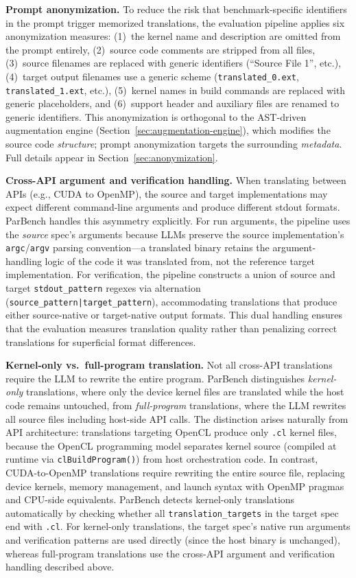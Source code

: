 \documentclass[conference]{IEEEtran}
\begin{document}
\textbf{Prompt anonymization.} To reduce the risk that benchmark-specific identifiers in the prompt trigger memorized translations, the evaluation pipeline applies six anonymization measures: (1)~the kernel name and description are omitted from the prompt entirely, (2)~source code comments are stripped from all files, (3)~source filenames are replaced with generic identifiers (``Source File 1'', etc.), (4)~target output filenames use a generic scheme (\texttt{translated\_0.ext}, \texttt{translated\_1.ext}, etc.), (5)~kernel names in build commands are replaced with generic placeholders, and (6)~support header and auxiliary files are renamed to generic identifiers. This anonymization is orthogonal to the AST-driven augmentation engine (Section~\ref{sec:augmentation-engine}), which modifies the source code \emph{structure}; prompt anonymization targets the surrounding \emph{metadata}. Full details appear in Section~\ref{sec:anonymization}.

\textbf{Cross-API argument and verification handling.} When translating between APIs (e.g., CUDA to OpenMP), the source and target implementations may expect different command-line arguments and produce different stdout formats. ParBench handles this asymmetry explicitly. For run arguments, the pipeline uses the \emph{source} spec's arguments because LLMs preserve the source implementation's \texttt{argc}/\texttt{argv} parsing convention---a translated binary retains the argument-handling logic of the code it was translated from, not the reference target implementation. For verification, the pipeline constructs a union of source and target \texttt{stdout\_pattern} regexes via alternation (\texttt{source\_pattern|target\_pattern}), accommodating translations that produce either source-native or target-native output formats. This dual handling ensures that the evaluation measures translation quality rather than penalizing correct translations for superficial format differences.

\textbf{Kernel-only vs.\ full-program translation.} Not all cross-API translations require the LLM to rewrite the entire program. ParBench distinguishes \emph{kernel-only} translations, where only the device kernel files are translated while the host code remains untouched, from \emph{full-program} translations, where the LLM rewrites all source files including host-side API calls. The distinction arises naturally from API architecture: translations targeting OpenCL produce only \texttt{.cl} kernel files, because the OpenCL programming model separates kernel source (compiled at runtime via \texttt{clBuildProgram()}) from host orchestration code. In contrast, CUDA-to-OpenMP translations require rewriting the entire source file, replacing device kernels, memory management, and launch syntax with OpenMP pragmas and CPU-side equivalents. ParBench detects kernel-only translations automatically by checking whether all \texttt{translation\_targets} in the target spec end with \texttt{.cl}. For kernel-only translations, the target spec's native run arguments and verification patterns are used directly (since the host binary is unchanged), whereas full-program translations use the cross-API argument and verification handling described above.
\end{document}
